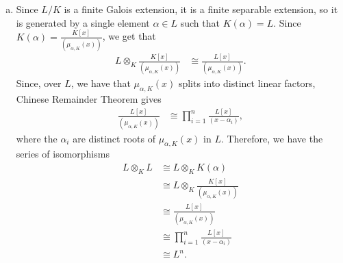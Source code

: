 \documentclass[10pt]{mypackage}
\begin{document}
\begin{solution}
\begin{enumerate}[(a)]
      To show surjectivity, we observe that if $n = \deg(f)$, then every element of $L[x]/\left( f(x) \right)$ is represented by a polynomial of the form
      \begin{align*}
        a(x) &= \sum_{i=0}^{n-1}a_i x^{i},
      \end{align*}
      with $a_i\in L$. Then, we have that
      \begin{align*}
        \varphi\left( \sum_{i=0}^{n-1} a_i\otimes \overline{x}^{i} \right) &= \sum_{i=0}^{n-1} a_i \overline{x}^{i}\\
                                                                           &= \overline{a(x)}.
      \end{align*}
      To show injectivity, we count dimensions over $L$. Observe that $1\otimes \overline{x}^{i}$ for $i=0,\dots,n-1$ forms an $L$-basis for $L\otimes_{K} K[x]/\left( f(x) \right)$, giving that $L\otimes_{K}K[x]/\left( f(x) \right)$ is dimension $n$ over $L$. Similarly, $ \overline{x}^{i} $ for $i=0,\dots,n-1$ forms an $L$-basis for $L[x]/\left( f(x) \right)$, so that the dimensions of both sides are equal, yielding that $\varphi$ is injective.
    \item Since $L/K$ is a finite Galois extension, it is a finite separable extension, so it is generated by a single element $\alpha\in L$ such that $K(\alpha) = L$. Since $K(\alpha) = \frac{K[x]}{\left( \mu_{\alpha,K}(x) \right)}$, we get that
      \begin{align*}
        L\otimes_{K} \frac{K[x]}{\left( \mu_{\alpha,K}(x) \right)} &\cong \frac{L[x]}{\left( \mu_{\alpha,K}(x) \right)}.
      \end{align*}
      Since, over $L$, we have that $\mu_{\alpha,K}(x)$ splits into distinct linear factors, Chinese Remainder Theorem gives
      \begin{align*}
        \frac{L[x]}{\left( \mu_{\alpha,K}(x) \right)} &\cong \prod_{i=1}^{n} \frac{L[x]}{\left( x-\alpha_i \right)},
      \end{align*}
      where the $\alpha_i$ are distinct roots of $\mu_{\alpha,K}(x)$ in $L$. Therefore, we have the series of isomorphisms
      \begin{align*}
        L\otimes_{K}L &\cong L\otimes_{K} K\left( \alpha \right)\\
                      &\cong L\otimes_{K} \frac{K[x]}{\left( \mu_{\alpha,K}(x) \right)}\\
                      &\cong \frac{L[x]}{\left( \mu_{\alpha,K}(x) \right)}\\
                      &\cong \prod_{i=1}^{n} \frac{L[x]}{\left( x-\alpha_i \right)}\\
                      &\cong L^{n}.
      \end{align*}
  \end{enumerate}
\end{solution}
\end{document}
